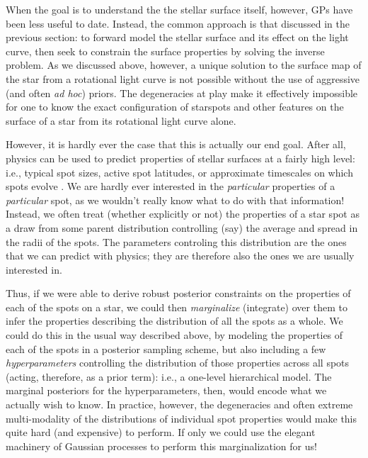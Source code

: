 \documentclass[modern]{aastex62}
\begin{document}
When the goal is to understand
the the stellar surface itself, however, GPs have been less useful to date.
Instead, the common approach is that discussed in the previous section:
to forward model the stellar surface and its effect on the light curve, then
seek to constrain the surface properties by solving the inverse problem.
As we discussed above, however, a unique solution to the surface map of
the star from a rotational light curve is not possible without the use of
aggressive (and often \emph{ad hoc}) priors. The degeneracies at play
make it effectively impossible for one to know the exact configuration
of starspots and other features on the surface of a star from its rotational
light curve alone.

However, it is hardly ever the case that this is actually our end goal.
After all, physics can be used to predict properties of stellar surfaces at a fairly
high level: i.e., typical spot sizes, active spot latitudes, or approximate
timescales on which spots evolve
\citep[e.g.,][]{Schuessler1996,Solanki2006,Cantiello2019}.
We are hardly ever interested in the
\emph{particular} properties of a \emph{particular} spot, as we wouldn't really
know what to do with that information! Instead, we often treat
(whether explicitly or not)
the properties of a star spot as a draw from some parent distribution
controlling (say) the average and spread in the radii of the spots.
The parameters controling this distribution are the ones that we can
predict with physics; they are therefore also the ones we are usually
interested in.

Thus, if we were able to derive robust posterior constraints
on the properties of each of the spots on a star, we could then
\emph{marginalize} (integrate) over them to infer the properties
describing the distribution of all the spots as a whole.
We could do this in the usual way described above, by
modeling the properties of each of the spots in a posterior sampling
scheme, but also including a few
\emph{hyperparameters} controlling the distribution of those properties
across all spots (acting, therefore, as a prior term): i.e., a one-level
hierarchical model. The marginal posteriors for the hyperparameters, then,
would encode what we actually wish to know.
%
In practice, however, the degeneracies and often extreme multi-modality
of the distributions of individual spot properties would make this
quite hard (and expensive) to perform.
%
If only we could use the elegant machinery of Gaussian processes to
perform this marginalization for us!
\end{document}
